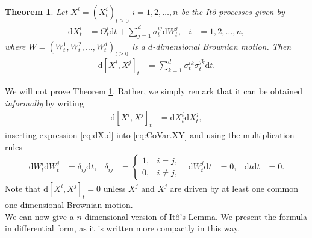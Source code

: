 \documentclass[12pt]{book}
\numberwithin{equation}{chapter}
\theoremstyle{plain}
\newtheorem{theorem}{\underline{Theorem}}
\numberwithin{theorem}{section}
\theoremstyle{definition}
\numberwithin{exercise}{chapter}
\newcommand{\<}{\langle}
\renewcommand{\>}{\rangle}
\renewcommand{\(}{\left(}
\renewcommand{\)}{\right)}
\renewcommand{\[}{\left[}
\renewcommand{\]}{\right]}
\newcommand\Rb{\mathds{R}}
\newcommand\sig{\sigma}
\newcommand\del{\delta}
\renewcommand\d{\partial}
\newcommand\dd{\mathrm{d}}
\begin{document}
\begin{theorem}
\label{thm:CoVar.XiXj}
Let $X^i=(X_t^i)_{t \geq 0}$ $i = 1, 2, \ldots, n$ be the It\^o processes given by
\begin{align}
\dd X_t^i
	&=	\Theta_t^i \dd t + \sum_{j=1}^d \sig_t^{ij} \dd W_t^j , &
i
	&=	1, 2, \ldots, n , \label{eq:dX.d} 
\end{align} 
where $W = (W_t^1, W_t^2, \ldots, W_t^{d})_{t \geq 0}$ is a $d$-dimensional Brownian motion.  Then
\begin{align}
\dd [ X^i, X^j ]_t
	&=	\sum_{k=1}^d \sig_t^{ik} \sig_t^{jk} \dd t . 
\end{align}
\end{theorem}


\noindent
We will not prove Theorem \ref{thm:CoVar.XiXj}.  Rather, we simply remark that it can be obtained \emph{informally} by writing
\begin{align}
\dd [X^i,X^j]_t
	&=	\dd X_t^i \dd X_t^j , \label{eq:CoVar.XY}
\end{align}
inserting expression \eqref{eq:dX.d} into \eqref{eq:CoVar.XY} and using the multiplication rules
\begin{align}
\dd W_t^i \dd W_t^j
	&=	\del_{ij} \dd t , &
\del_{ij}
	&=	\left\{ \begin{array}{ll}
			1 , & i=j , \\
			0 , & i\neq j ,
			\end{array} \right. &
\dd W_t^j \dd t
	&= 0 , &
\dd t \dd t
	&=	0 . \label{eq:rules.2}
\end{align}
Note that $\dd [X^i,X^j]_t = 0$ unless $X^j$ and $X^j$ are driven by at least one common one-dimensional Brownian motion.
\\[0.5em]
We can now give a $n$-dimensional version of It\^o's Lemma.  We present the formula in differential form, as it is written more compactly in this way.


\end{document}
